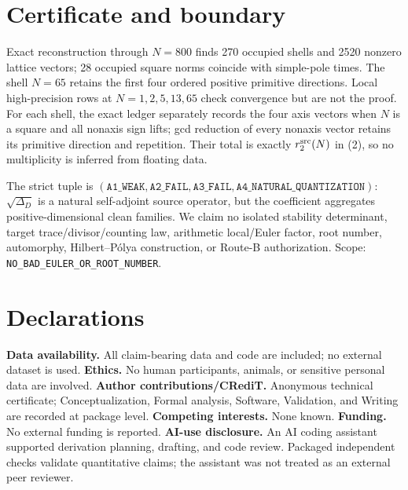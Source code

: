 \documentclass[10pt]{article}
\begin{document}
\section{Certificate and boundary}
Exact reconstruction through $N=800$ finds 270 occupied shells and 2520
nonzero lattice vectors; 28 occupied square norms coincide with simple-pole
times.  The shell $N=65$ retains the first four ordered positive primitive
directions.  Local high-precision rows at $N=1,2,5,13,65$ check convergence
but are not the proof.
For each shell, the exact ledger separately records the four axis vectors when
$N$ is a square and all nonaxis sign lifts; gcd reduction of every nonaxis
vector retains its primitive direction and repetition.  Their total is exactly
$r_2^{\rm src}(N)$ in (2), so no multiplicity is inferred from floating data.

The strict tuple is $(\texttt{A1\_WEAK},\texttt{A2\_FAIL},
\texttt{A3\_FAIL},\texttt{A4\_NATURAL\_QUANTIZATION})$:
$\sqrt{\Delta_D}$ is a natural self-adjoint source operator, but the
coefficient aggregates positive-dimensional clean families.  We claim no
isolated stability determinant, target trace/divisor/counting law, arithmetic
local/Euler factor, root number, automorphy, Hilbert--P\'olya construction, or
Route-B authorization.  Scope: \texttt{NO\_BAD\_EULER\_OR\_ROOT\_NUMBER}.

\section*{Declarations}
\textbf{Data availability.} All claim-bearing data and code are included; no
external dataset is used.  \textbf{Ethics.} No human participants, animals, or
sensitive personal data are involved.  \textbf{Author contributions/CRediT.}
Anonymous technical certificate; Conceptualization, Formal analysis, Software,
Validation, and Writing are recorded at package level.  \textbf{Competing
interests.} None known.  \textbf{Funding.} No external funding is reported.
\textbf{AI-use disclosure.} An AI coding assistant supported derivation
planning, drafting, and code review.  Packaged independent checks validate
quantitative claims; the assistant was not treated as an external peer reviewer.
\end{document}

